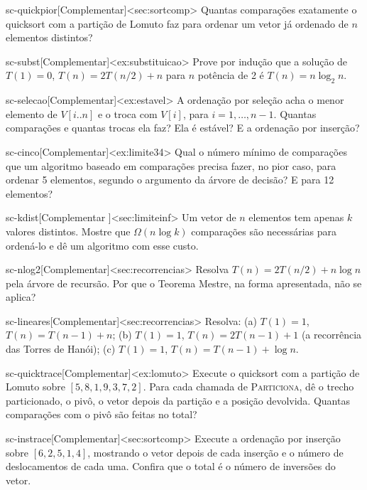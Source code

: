 \begin{exercicio}{sc-quickpior}[Complementar]<sec:sortcomp>
Quantas comparações exatamente o quicksort com a partição de Lomuto faz para ordenar um vetor já ordenado de $n$ elementos distintos?
\end{exercicio}
\begin{exercicio}{sc-subst}[Complementar]<ex:substituicao>
Prove por indução que a solução de $T(1)=0$, $T(n)=2T(n/2)+n$ para $n$ potência de 2 é $T(n)=n\log_2n$.
\end{exercicio}
\begin{exercicio}{sc-selecao}[Complementar]<ex:estavel>
A ordenação por seleção acha o menor elemento de $V[i..n]$ e o troca com $V[i]$, para $i=1,\dots,n-1$. Quantas comparações e quantas trocas ela faz? Ela é estável? E a ordenação por inserção?
\end{exercicio}
\begin{exercicio}{sc-cinco}[Complementar]<ex:limite34>
Qual o número mínimo de comparações que um algoritmo baseado em comparações precisa fazer, no pior caso, para ordenar 5 elementos, segundo o argumento da árvore de decisão? E para 12 elementos?
\end{exercicio}
\begin{exercicio}{sc-kdist}[Complementar \estrela]<sec:limiteinf>
Um vetor de $n$ elementos tem apenas $k$ valores distintos. Mostre que $\Omega(n\log k)$ comparações são necessárias para ordená-lo e dê um algoritmo com esse custo.
\end{exercicio}
\begin{exercicio}{sc-nlog2}[Complementar]<sec:recorrencias>
Resolva $T(n)=2T(n/2)+n\log n$ pela árvore de recursão. Por que o Teorema Mestre, na forma apresentada, não se aplica?
\end{exercicio}
\begin{exercicio}{sc-lineares}[Complementar]<sec:recorrencias>
Resolva: (a) $T(1)=1$, $T(n)=T(n-1)+n$; (b) $T(1)=1$, $T(n)=2T(n-1)+1$ (a recorrência das Torres de Hanói); (c) $T(1)=1$, $T(n)=T(n-1)+\log n$.
\end{exercicio}
\begin{exercicio}{sc-quicktrace}[Complementar]<ex:lomuto>
Execute o quicksort com a partição de Lomuto sobre $[5,8,1,9,3,7,2]$. Para cada chamada de \textsc{Particiona}, dê o trecho particionado, o pivô, o vetor depois da partição e a posição devolvida. Quantas comparações com o pivô são feitas no total?
\end{exercicio}
\begin{exercicio}{sc-instrace}[Complementar]<sec:sortcomp>
Execute a ordenação por inserção sobre $[6,2,5,1,4]$, mostrando o vetor depois de cada inserção e o número de deslocamentos de cada uma. Confira que o total é o número de inversões do vetor.
\end{exercicio}
